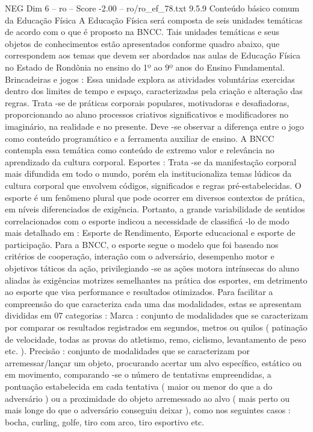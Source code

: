 \begin{textsample}{NEG Dim 6 – ro – Score -2.00 – ro/ro\_ef\_78.txt}  \label{ex:f6_neg_151}
9.5.9 Conteúdo básico comum da Educação Física A Educação Física será composta de seis unidades temáticas de acordo com o que é proposto na BNCC.
Tais unidades temáticas e seus objetos de conhecimentos estão apresentados conforme quadro abaixo, que correspondem aos temas que devem ser abordados nas aulas de Educação Física no Estado de Rondônia no ensino do 1º ao 9º anos do Ensino Fundamental.
Brincadeiras e jogos : Essa unidade explora as atividades voluntárias exercidas dentro dos limites de tempo e espaço, caracterizadas pela criação e alteração das regras.
Trata -se de práticas corporais populares, motivadoras e desafiadoras, proporcionando ao aluno processos criativos significativos e modificadores no imaginário, na realidade e no presente.
Deve -se observar a diferença entre o jogo como conteúdo programático e a ferramenta auxiliar de ensino.
A BNCC contempla essa temática como conteúdo de extremo valor e relevância no aprendizado da cultura corporal.
Esportes : Trata -se da manifestação corporal mais difundida em todo o mundo, porém ela institucionaliza temas lúdicos da cultura corporal que envolvem códigos, significados e regras pré-estabelecidas.
O esporte é um fenômeno plural que pode ocorrer em diversos contextos de prática, em níveis diferenciados de exigência.
Portanto, a grande variabilidade de sentidos correlacionados com o esporte indicou a necessidade de classificá -lo de modo mais detalhado em : Esporte de Rendimento, Esporte educacional e esporte de participação.
Para a BNCC, o esporte segue o modelo que foi baseado nos critérios de cooperação, interação com o adversário, desempenho motor e objetivos táticos da ação, privilegiando -se as ações motora intrínsecas do aluno aliadas às exigências motrizes semelhantes na prática dos esportes, em detrimento ao esporte que visa performance e resultados otimizados.
Para facilitar a compreensão do que caracteriza cada uma das modalidades, estas se apresentam divididas em 07 categorias : Marca : conjunto de modalidades que se caracterizam por comparar os resultados registrados em segundos, metros ou quilos ( patinação de velocidade, todas as provas do atletismo, remo, ciclismo, levantamento de peso etc. ).
Precisão : conjunto de modalidades que se caracterizam por arremessar/lançar um objeto, procurando acertar um alvo específico, estático ou em movimento, comparando -se o número de tentativas empreendidas, a pontuação estabelecida em cada tentativa ( maior ou menor do que a do adversário ) ou a proximidade do objeto arremessado ao alvo ( mais perto ou mais longe do que o adversário conseguiu deixar ), como nos seguintes casos : bocha, curling, golfe, tiro com arco, tiro esportivo etc.

\end{textsample}
